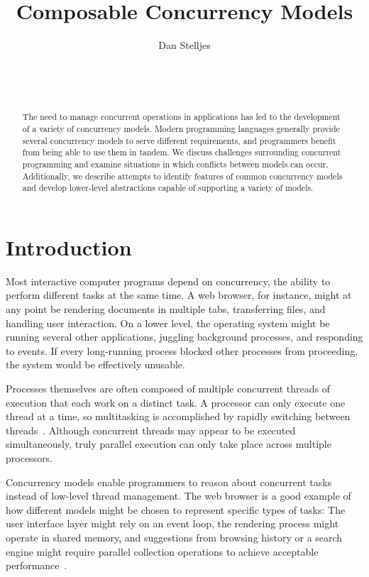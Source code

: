 \documentclass{sig-alternate}
\author{
\alignauthor{}
Dan Stelljes\\
  \affaddr{Division of Science and Mathematics}\\
  \affaddr{University of Minnesota, Morris}\\
  \affaddr{Morris, Minnesota, USA 56267}\\
  \email{stell124@morris.umn.edu}
}
\title{Composable Concurrency Models}
\begin{document}
\maketitle

\begin{abstract}

The need to manage concurrent operations in applications has led to the development of a variety of concurrency models. Modern programming languages generally provide several concurrency models to serve different requirements, and programmers benefit from being able to use them in tandem. We discuss challenges surrounding concurrent programming and examine situations in which conflicts between models can occur. Additionally, we describe attempts to identify features of common concurrency models and develop lower-level abstractions capable of supporting a variety of models.

\end{abstract}

\section{Introduction}

Most interactive computer programs depend on concurrency, the ability to perform different tasks at the same time. A web browser, for instance, might at any point be rendering documents in multiple tabs, transferring files, and handling user interaction. On a lower level, the operating system might be running several other applications, juggling background processes, and responding to events. If every long-running process blocked other processes from proceeding, the system would be effectively unusable.

Processes themselves are often composed of multiple concurrent threads of execution that each work on a distinct task. A processor can only execute one thread at a time, so multitasking is accomplished by rapidly switching between threads~\cite{Liu1973}. Although concurrent threads may appear to be executed simultaneously, truly parallel execution can only take place across multiple processors.

Concurrency models enable programmers to reason about concurrent tasks instead of low-level thread management. The web browser is a good example of how different models might be chosen to represent specific types of tasks: The user interface layer might rely on an event loop, the rendering process might operate in shared memory, and suggestions from browsing history or a search engine might require parallel collection operations to achieve acceptable performance~\cite{Marr2012}.
\end{document}
